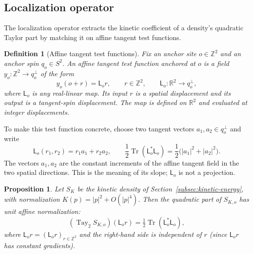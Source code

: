 \documentclass[11pt]{article}
\newcommand{\R}{\mathbb R}
\newcommand{\Z}{\mathbb Z}
\newcommand{\tr}{\operatorname{Tr}}
\newcommand{\Tay}{\operatorname{Tay}}
\numberwithin{equation}{section}
\newtheorem{proposition}[theorem]{Proposition}
\newtheorem{definition}[theorem]{Definition}
\theoremstyle{definition}
\theoremstyle{plain}
\begin{document}
\subsection{Localization operator}
\label{subsec:localization}

The localization operator extracts the kinetic coefficient of a
density's quadratic Taylor part by matching it on affine tangent
test functions.

\begin{definition}[Affine tangent test functions]
\label{def:affine-test-functions}
Fix an anchor site $o\in\Z^2$ and an anchor spin $q_o\in S^2$.
An affine tangent test function anchored at $o$ is a field
$y_o:\Z^2\to q_o^\perp$ of the form
\begin{equation}
 y_o(o+r)=\mathsf L_o r,\qquad r\in\Z^2,\qquad
 \mathsf L_o:\R^2\longrightarrow q_o^\perp,
 \label{eq:affine-test-functions}
\end{equation}
where $\mathsf L_o$ is any real-linear map.  Its input $r$ is a
spatial displacement and its output is a tangent-spin displacement.
The map is defined on $\R^2$ and evaluated at integer
displacements.
\end{definition}

To make this test function concrete, choose two tangent vectors
$a_1,a_2\in q_o^\perp$ and write
\begin{equation}
 \mathsf L_o(r_1,r_2)=r_1a_1+r_2a_2,
 \qquad
 \frac12\tr(\mathsf L_o^*\mathsf L_o)
 =\frac12\bigl(|a_1|^2+|a_2|^2\bigr).
\end{equation}
The vectors $a_1,a_2$ are the constant increments of the affine
tangent field in the two spatial directions.  This is the meaning
of its slope; $\mathsf L_o$ is not a projection.


\begin{proposition}
\label{prop:kinetic-normalization}
Let $S_{K}$ be the kinetic density of
Section~\ref{subsec:kinetic-energy}, with normalization $K(p)=|p|^2+O(|p|^4)$.
Then the quadratic part of $S_{K,o}$ has unit affine normalization:
\begin{equation}
 (\Tay_2 S_{K,o})(\mathsf L_o r)
   =\tfrac12\tr(\mathsf L_o^*\mathsf L_o),
 \label{eq:kinetic-loc-normalization}
\end{equation}
where $\mathsf L_o r = (\mathsf L_o r)_{r \in \Z^2}$ and
the right-hand side is independent of $r$ (since $\mathsf L_o r$
has constant gradients).
\end{proposition}
\end{document}
